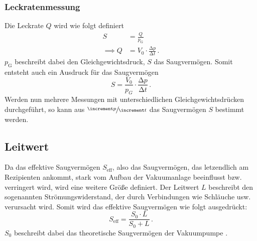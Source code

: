         \subsubsection{Leckratenmessung}
            Die Leckrate $Q$ wird wie folgt definiert
            \begin{align*}
                S &= \frac{Q}{p_\text{G}} \\
                \implies Q &= V_0 \cdot \frac{\increment p}{\increment t} \, .
            \end{align*}
            $p_\text{G}$ beschreibt dabei den Gleichgewichtsdruck, $S$ das Saugvermögen.
            Somit entsteht auch ein Ausdruck für das Saugvermögen
            \begin{equation}
                S = \frac{V_0}{p_G} \cdot \frac{\increment p}{\increment t} \, .
                \label{eq:saug_leck_theorie}
            \end{equation}
            Werden nun mehrere Messungen mit unterschiedlichen Gleichgewichtsdrücken durchgeführt, so kann aus $\sfrac{\increment p}{\increment t}$ das Saugvermögen $S$ bestimmt werden.

        \subsection{Leitwert}
        \label{subsec:leitwert}
            Da das effektive Saugvermögen $S_\text{eff}$, also das Saugvermögen, das letzendlich am Rezipienten ankommt, stark vom Aufbau der Vakuumanlage beeinflusst bzw. verringert wird, wird eine weitere Größe definiert.
            Der Leitwert $L$ beschreibt den sogenannten Strömungswiderstand, der durch Verbindungen wie Schläuche usw. verursacht wird.
            Somit wird das effektive Saugvermögen wie folgt ausgedrückt:
            \begin{equation*}
                S_\text{eff} = \frac{S_0 \cdot L}{S_0 + L} \, .
            \end{equation*}
            $S_0$ beschreibt dabei das theoretische Saugvermögen der Vakuumpumpe \cite{Pfeiffer}.


